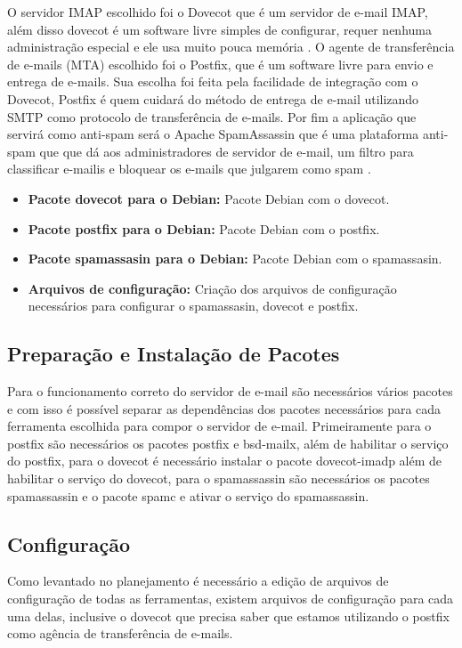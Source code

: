 O servidor IMAP escolhido foi o Dovecot que é um servidor de e-mail
IMAP, além disso dovecot é um software livre simples de configurar, requer nenhuma
administração especial e ele usa muito pouca memória \cite{dovecot}. O agente
de transferência de e-mails (MTA) escolhido foi o Postfix, que é um software
livre para envio e entrega de e-mails. Sua escolha foi feita pela facilidade de
integração com o Dovecot, Postfix é quem cuidará do método de entrega de e-mail
utilizando SMTP como protocolo de transferência de e-mails. Por fim a aplicação
que servirá como anti-spam será o Apache SpamAssassin que é uma plataforma anti-spam
que que dá aos administradores de servidor de e-mail, um filtro para classificar
 e-mailis e bloquear os e-mails que julgarem como spam \cite{spam}.

\begin{itemize}
   \item \textbf{Pacote dovecot para o Debian:} Pacote Debian com o dovecot.
   \item \textbf{Pacote postfix para o Debian:} Pacote Debian com o postfix.
   \item \textbf{Pacote spamassasin para o Debian:} Pacote Debian com o spamassasin.
   \item \textbf{Arquivos de configuração:} Criação dos arquivos de configuração
   necessários para configurar o spamassasin, dovecot e postfix.
\end{itemize}

\subsection{Preparação e Instalação de Pacotes }

Para o funcionamento correto do servidor de e-mail são necessários vários pacotes
e com isso é possível separar as dependências dos pacotes necessários para cada ferramenta
escolhida para compor o servidor de e-mail. Primeiramente para o postfix são necessários
os pacotes postfix e bsd-mailx, além de habilitar o serviço do postfix, para o dovecot
é necessário instalar o pacote dovecot-imadp além de habilitar o serviço do dovecot,
para o spamassassin são necessários os pacotes spamassassin e o pacote spamc e ativar
o serviço do spamassassin.

\subsection{Configuração}

Como levantado no planejamento é necessário a edição de arquivos de configuração
de todas as ferramentas, existem arquivos de configuração para cada uma delas, inclusive
o dovecot que precisa saber que estamos utilizando o postfix como agência de transferência
de e-mails.

